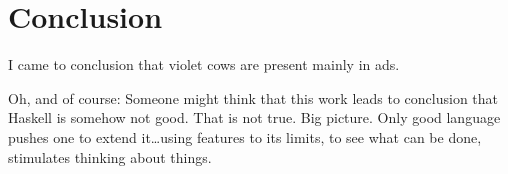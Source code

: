 \documentclass[11pt,oneside,draft]{fithesis2}
\theoremstyle{definition}
\begin{document}
\chapter{Conclusion}

I came to conclusion that violet cows are present mainly in ads.

Oh, and of course:
Someone might think that this work leads to conclusion that Haskell is somehow not good.
That is not true. Big picture. Only good language pushes one to extend it\dots using features
to its limits, to see what can be done, stimulates thinking about things.

\clearpage
{}
{}
%


\end{document}
